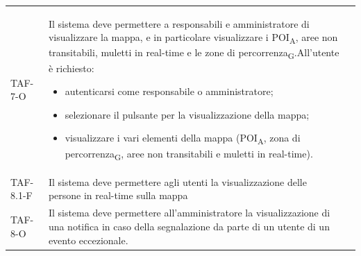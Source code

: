 \begin{longtable}{ >{\centering}p{} >{}p{}
		>{\centering}p{}}
	TAF-7-O & Il sistema deve permettere a responsabili e amministratore di visualizzare la mappa, e in particolare visualizzare i POI\textsubscript{A}, aree non transitabili, muletti in real-time e le zone di percorrenza\textsubscript{G}.\newline All'utente è richiesto:\begin{itemize} \item autenticarsi come responsabile o amministratore; \item selezionare il pulsante per la visualizzazione della mappa; \item visualizzare i vari elementi della mappa (POI\textsubscript{A}, zona di percorrenza\textsubscript{G}, aree non transitabili e muletti in real-time). \end{itemize} & 0\tabularnewline
	TAF-8.1-F & Il sistema deve permettere agli utenti la visualizzazione delle persone in real-time sulla mappa & 0\tabularnewline
	

	TAF-8-O & Il sistema deve permettere all'amministratore la visualizzazione di una notifica in caso della segnalazione da parte di un utente di un evento eccezionale. & 0\tabularnewline


\end{longtable}
